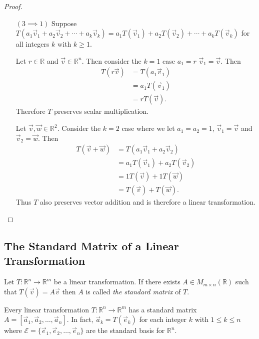 \begin{proof}
\begin{enumerate}
\item[$(3 \implies 1)$] Suppose 
$T(a_1\vec{v}_1+a_2\vec{v}_2+\cdots+a_k\vec{v}_k)=
a_1T(\vec{v}_1)+a_2T(\vec{v}_2)+\cdots+a_kT(\vec{v}_k)$ for all integers $k$ with $k \ge 1$.

Let $r\in \mathbb{R}$ and $\vec{v} \in \mathbb{R}^n$.
Then consider the $k=1$ case $a_1=r$ $\vec{v}_1=\vec{v}$. Then 
\begin{align*}
T(r\vec{v})&=T(a_1\vec{v}_1)\\
&=a_1T(\vec{v}_1)\\
&=rT(\vec{v}).
\end{align*}
Therefore $T$ preserves scalar multiplication.

Let $\vec{v},\vec{w} \in \mathbb{R}^2$. Consider the $k=2$ case where we let 
$a_1=a_2=1$, $\vec{v}_1=\vec{v}$ and $\vec{v}_2=\vec{w}$. Then
\begin{align*}
T(\vec{v}+\vec{w})&=T(a_1\vec{v}_1+a_2\vec{v}_2)\\
&=a_1T(\vec{v}_1)+a_2T(\vec{v}_2)\\
&=1T(\vec{v})+1T(\vec{w})\\
&=T(\vec{v})+T(\vec{w}).
\end{align*}
Thus $T$ also preserves vector addition and is therefore a 
linear transformation.
\end{enumerate}
\end{proof}



\subsection{The Standard Matrix of a Linear Transformation}

\begin{definition}
Let  $T:\mathbb{R}^n \to \mathbb{R}^m$ be a linear transformation. If there 
exists $A \in M_{m\times n}(\mathbb{R})$ such that $T(\vec{v})=A\vec{v}$ then 
$A$ is called \emph{the standard matrix} of $T$.
\end{definition}

\begin{theorem} Every linear transformation $T:\mathbb{R}^n \to \mathbb{R}^m$ 
has a standard matrix $A=[\vec{a}_1,\vec{a}_2, \ldots, \vec{a}_n]$. In fact,
$\vec{a}_k=T(\vec{e}_k)$ for each integer $k$ with $1 \le k \le n$ 
where $\mathcal{E}=\{\vec{e}_1,\vec{e}_2,\ldots,\vec{e}_n\}$ are the 
standard basis for $\mathbb{R}^n$.\label{thm:standard_matrix}
\end{theorem}

